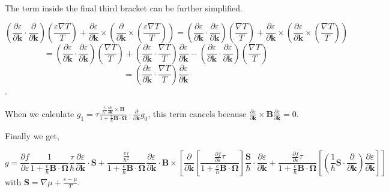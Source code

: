 \documentclass{revtex4-2}
\newcommand{\bvec}[1]{{\mathbf #1}}
\begin{document}
The term inside the final third bracket can be further simplified.

$$ (\frac{\partial \varepsilon}{\partial \bvec{k}} \cdot \frac{\partial }{\partial \bvec{k}}) (\frac{\varepsilon \nabla T}{T}) + \frac{\partial \varepsilon}{\partial \bvec{k}} \times \left(  \frac{\partial }{\partial \bvec{k}} \times \left(\frac{\varepsilon \nabla T}{T}\right) \right) = (\frac{\partial \varepsilon}{\partial \bvec{k}} \cdot \frac{\partial \varepsilon}{\partial \bvec{k}}) (\frac{ \nabla T}{T}) + \frac{\partial \varepsilon}{\partial \bvec{k}} \times \left(  \frac{\partial \varepsilon}{\partial \bvec{k}} \times \left(\frac{\nabla T}{T}\right) \right)$$
$$  =(\frac{\partial \varepsilon}{\partial \bvec{k}} \cdot \frac{\partial \varepsilon}{\partial \bvec{k}}) (\frac{ \nabla T}{T}) + \left(  \frac{\partial \varepsilon}{\partial \bvec{k}} \cdot \frac{\nabla T}{T}\right) \frac{\partial \varepsilon}{\partial \bvec{k}} -  (\frac{\partial \varepsilon}{\partial \bvec{k}} \cdot \frac{\partial \varepsilon}{\partial \bvec{k}}) (\frac{ \nabla T}{T})$$
$$= \left(  \frac{\partial \varepsilon}{\partial \bvec{k}} \cdot \frac{\nabla T}{T}\right) \frac{\partial \varepsilon}{\partial \bvec{k}}$$.

When we calculate $g_1 = \tau \frac{\frac{e}{\hbar^2} \frac{\partial \varepsilon}{\partial \bvec{k}} \times \bvec{B}}{1 + \frac{e}{\hbar} \bvec{B}\cdot\bvec{\Omega}} \cdot\frac{\partial}{\partial \bvec{k}} g_0$, this term cancels because $\frac{\partial \varepsilon}{\partial \bvec{k}} \times \bvec{B}  \frac{\partial \varepsilon}{\partial \bvec{k}} = 0$.

Finally we get,

\begin{equation}
g = \frac{\partial f} {\partial \varepsilon}\frac{1}{1 + \frac{e}{\hbar} \bvec{B}\cdot\bvec{\Omega}}
\frac{\tau}{\hbar} \frac{\partial \varepsilon}{\partial \bvec{k}}\cdot  \bvec{S} + \frac{\frac{e \tau}{\hbar^2} }{1 + \frac{e}{\hbar} \bvec{B}\cdot\bvec{\Omega}} \frac{\partial \varepsilon}{\partial \bvec{k}} \cdot \bvec{B} \times \left[ \frac{\partial}{\partial \bvec{k}} \left[ \frac{\frac{\partial f} {\partial \varepsilon} \tau}{1 + \frac{e}{\hbar} \bvec{B}\cdot\bvec{\Omega}}
\right] \frac{\bvec{S}}{\hbar} \cdot \frac{\partial \varepsilon}{\partial \bvec{k}} + \frac{\frac{\partial f} {\partial \varepsilon} \tau}{1 + \frac{e}{\hbar} \bvec{B}\cdot\bvec{\Omega}} \left[(\frac{1}{\hbar} \bvec{S}\cdot \frac{\partial }{\partial \bvec{k}} )\frac{\partial \varepsilon}{\partial \bvec{k}} \right] \right]
\end{equation}\label{Eq:g_non_zero_chem_temp_grad}
with $\bvec{S} = \nabla \mu + \frac{\varepsilon - \mu}{T}$.
\end{document}
